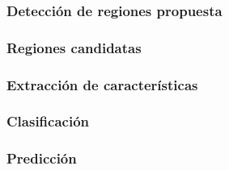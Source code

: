 \subsubsection*{Detección de regiones propuesta}
\subsubsection*{Regiones candidatas}
\subsubsection*{Extracción de características}
\subsubsection*{Clasificación}
\subsubsection*{Predicción}

